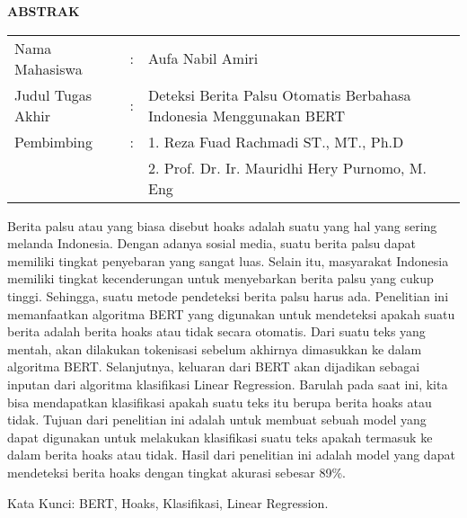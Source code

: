 \begin{center}
  \large\textbf{ABSTRAK}
\end{center}


\vspace{2ex}

\begingroup
\setlength{\tabcolsep}{0pt}

\noindent
\begin{tabularx}{\textwidth}{l >{\centering}m{2em} X}
  Nama Mahasiswa    & : & Aufa Nabil Amiri                                                   \\

  Judul Tugas Akhir & : & Deteksi Berita Palsu Otomatis Berbahasa Indonesia Menggunakan BERT \\

  Pembimbing        & : & 1. Reza Fuad Rachmadi ST., MT., Ph.D                               \\
                    &   & 2. Prof. Dr. Ir. Mauridhi Hery Purnomo, M. Eng                     \\
\end{tabularx}
\endgroup

Berita palsu atau yang biasa disebut hoaks adalah suatu yang hal yang sering melanda Indonesia. Dengan adanya sosial media, suatu berita palsu dapat memiliki tingkat penyebaran yang sangat luas. Selain itu, masyarakat Indonesia memiliki tingkat kecenderungan untuk menyebarkan berita palsu yang cukup tinggi. Sehingga, suatu metode pendeteksi berita palsu harus ada. Penelitian ini memanfaatkan algoritma BERT yang digunakan untuk mendeteksi apakah suatu berita adalah berita hoaks atau tidak secara otomatis. Dari suatu teks yang mentah, akan dilakukan tokenisasi sebelum akhirnya dimasukkan ke dalam algoritma BERT. Selanjutnya, keluaran dari BERT akan dijadikan sebagai inputan dari algoritma klasifikasi Linear Regression.  Barulah pada saat ini, kita bisa mendapatkan klasifikasi apakah suatu teks itu berupa berita hoaks atau tidak. Tujuan dari penelitian ini adalah untuk membuat sebuah model yang dapat digunakan untuk melakukan klasifikasi suatu teks apakah termasuk ke dalam berita hoaks atau tidak. Hasil dari penelitian ini adalah model yang dapat mendeteksi berita hoaks dengan tingkat akurasi sebesar 89\%.

Kata Kunci:   BERT, Hoaks, Klasifikasi, Linear Regression.
